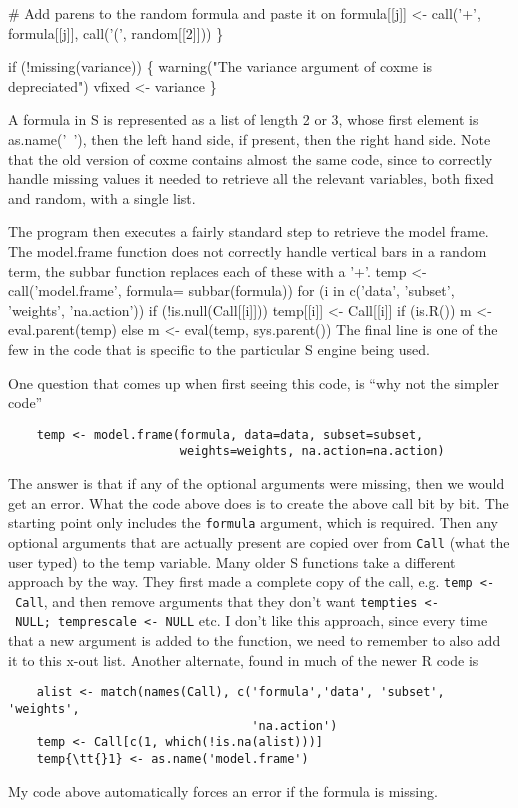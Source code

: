 \documentclass{article}
\begin{document}
    # Add parens to the random formula and paste it on
    formula[[j]] <- call('+', formula[[j]], call('(', random[[2]]))  
    \}

if (!missing(variance)) \{
    warning("The variance argument of coxme is depreciated")
    vfixed <- variance
    \}

\nwendcode{}\nwdocspar
A formula in S is represented as a list of length 2 or 3, whose first element
is as.name('~'), then the left hand side, if present, then the right hand side.
Note that the old version of coxme contains almost the same code, since
to correctly handle missing values it needed to retrieve all the
relevant variables, both fixed and random, with a single list.

The program then executes a fairly standard step to retrieve the model
frame.  
The model.frame function does not correctly handle vertical bars in
a random term, the subbar function replaces each of these with a '+'.
\nwenddocs{}\plusendmoddef
temp <- call('model.frame', formula= subbar(formula))
for (i in c('data', 'subset', 'weights', 'na.action'))
    if (!is.null(Call[[i]])) temp[[i]] <- Call[[i]]
if (is.R()) m <- eval.parent(temp)
else        m <- eval(temp, sys.parent())
\nwendcode{}\nwdocspar
The final line  is one of the few in the code that is specific to the
particular S engine being used.

One question that comes up when first seeing this code, is ``why not the
simpler code''
\begin{verbatim}
    temp <- model.frame(formula, data=data, subset=subset, 
                        weights=weights, na.action=na.action)
\end{verbatim}
The answer is that if any of the optional arguments were missing, then we would
get an error.  
What the code above does is to create the above call bit by bit. 
The starting point only includes the {\tt{}formula} argument, which is
required.
Then any optional arguments that are actually present are copied over
from {\tt{}Call} (what the user typed) to the temp variable.
Many older S functions take a different approach by the way.  They first made
a complete copy of the call, e.g. {\tt{}temp\ <-\ Call}, and then 
remove arguments that they don't want
{\tt{}temp{}ties\ <-\ NULL;\ temp{}rescale\ <-\ NULL} etc.
I don't like this approach, since every time that a new argument
is added to the function, we need to remember to also add
it to this x-out list.  
Another alternate, found in much of the newer R code is
\begin{verbatim}
    alist <- match(names(Call), c('formula','data', 'subset', 'weights',
                                  'na.action')
    temp <- Call[c(1, which(!is.na(alist)))]
    temp{\tt{}1} <- as.name('model.frame')
\end{verbatim}
My code above automatically forces an error if the formula is missing.
\end{document}
